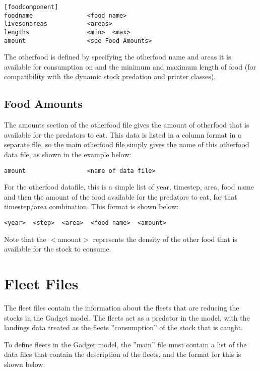 \documentclass [a4paper, 10pt]{book}
\begin{document}
{\small\begin{verbatim}
[foodcomponent]
foodname               <food name>
livesonareas           <areas>
lengths                <min>  <max>
amount                 <see Food Amounts>
\end{verbatim}}

The otherfood is defined by specifying the otherfood name and areas it is available for consumption on and the minimum and maximum length of food (for compatibility with the dynamic stock predation and printer classes).

\newpage %
\section{Food Amounts}\label{sec:foodamounts}
The amounts section of the otherfood file gives the amount of otherfood that is available for the predators to eat.  This data is listed in a column format in a separate file, so the main otherfood file simply gives the name of this otherfood data file, as shown in the example below:

{\small\begin{verbatim}
amount                 <name of data file>
\end{verbatim}}

For the otherfood datafile, this is a simple list of year, timestep, area, food name and then the amount of the food available for the predators to eat, for that timestep/area combination.  This format is shown below:

{\small\begin{verbatim}
<year>  <step>  <area>  <food name>  <amount>
\end{verbatim}}

Note that the $<$amount$>$ represents the density of the other food that is available for the stock to consume.

\chapter{Fleet Files}\label{chap:fleet}
The fleet files contain the information about the fleets that are reducing the stocks in the Gadget model.  The fleets act as a predator in the model, with the landings data treated as the fleets ''consumption'' of the stock that is caught.

\bigskip
To define fleets in the Gadget model, the ''main'' file must contain a list of the data files that contain the description of the fleets, and the format for this is shown below:
\end{document}
